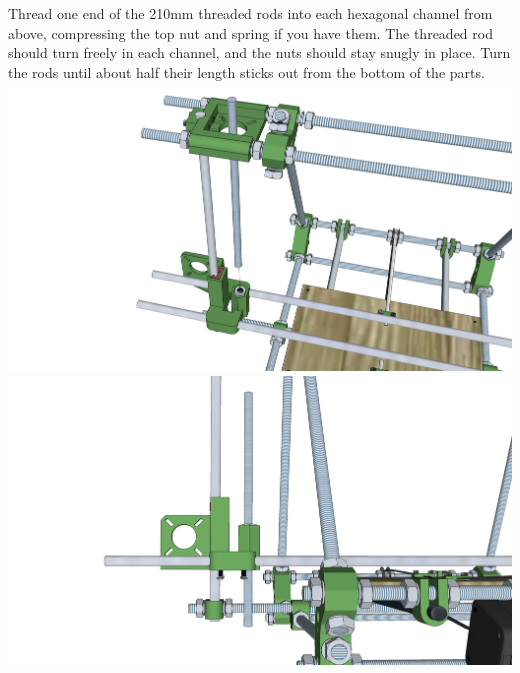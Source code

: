 \documentclass[twoside,a4paper,titlepage]{memoir}
\begin{document}
	\section{}
	Thread one end of the 210mm threaded rods into each hexagonal channel from above, compressing
	the top nut and spring if you have them. The threaded rod should turn freely in each channel, and the
	nuts should stay snugly in place. Turn the rods until about half their length sticks out from the bottom of
	the parts.\\
	\includegraphics[width=1\linewidth]{graphics/ch8_18_1.png}
	\includegraphics[width=1\linewidth]{graphics/ch8_18_2.png}
	
\end{document}
